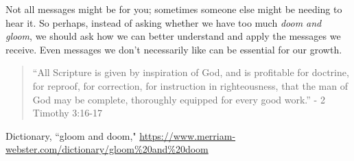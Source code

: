 \documentclass[10pt]{article}
\begin{document}
\begin{multicols}{2}
Not all messages might be for you; sometimes someone else might be needing to hear it. So perhaps, instead of asking whether we have too much \textit{doom and gloom}, we should ask how we can better understand and apply the messages we receive. Even messages we don't necessarily like can be essential for our growth.

\begin{quotation}
	``All Scripture is given by inspiration of God, and is profitable for doctrine, for reproof, for correction, for instruction in righteousness, that the man of God may be complete, thoroughly equipped for every good work.'' - 2 Timothy 3:16-17
\end{quotation}

\begin{thebibliography}{9}
	{\footnotesize
	 Dictionary, ``gloom and doom," \url{https://www.merriam-webster.com/dictionary/gloom%20and%20doom}

	}
\end{thebibliography}

\end{multicols}


\end{document}

